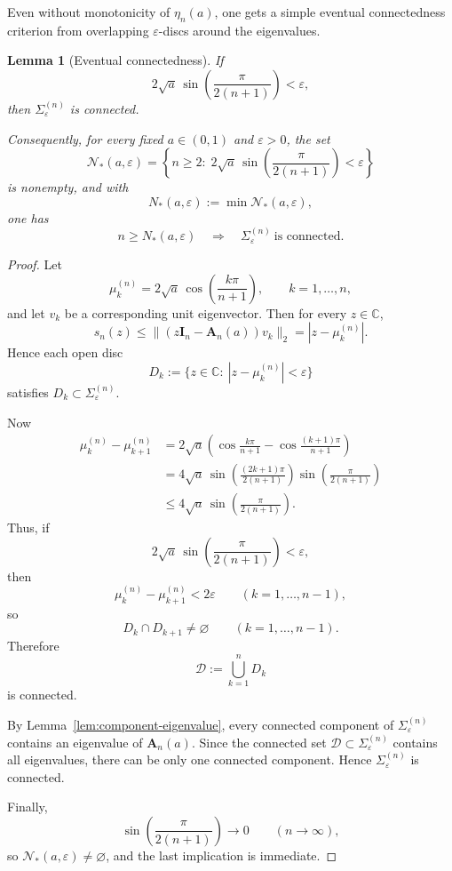 \documentclass[11pt]{article}
\numberwithin{equation}{section}
\newtheorem{lemma}[theorem]{Lemma}
\newcommand{\C}{\mathbb C}
\newcommand{\A}{\mathbf A}
\newcommand{\I}{\mathbf I}
\begin{document}
Even without monotonicity of \(\eta_n(a)\), one gets a simple eventual connectedness
criterion from overlapping \(\varepsilon\)-discs around the eigenvalues.

\begin{lemma}[Eventual connectedness]\label{lem:eventual-connectedness}
If
\[
2\sqrt a\,\sin\!\left(\frac{\pi}{2(n+1)}\right)<\varepsilon,
\]
then \(\Sigma_\varepsilon^{(n)}\) is connected.

Consequently, for every fixed \(a\in(0,1)\) and \(\varepsilon>0\), the set
\[
\mathcal N_*(a,\varepsilon)
=
\left\{
n\ge2:\;
2\sqrt a\,\sin\!\left(\frac{\pi}{2(n+1)}\right)<\varepsilon
\right\}
\]
is nonempty, and with
\[
N_*(a,\varepsilon):=\min \mathcal N_*(a,\varepsilon),
\]
one has
\[
n\ge N_*(a,\varepsilon)
\quad\Longrightarrow\quad
\Sigma_\varepsilon^{(n)}\ \text{is connected}.
\]
\end{lemma}

\begin{proof}
Let
\[
\mu_k^{(n)}=2\sqrt a\,\cos\!\left(\frac{k\pi}{n+1}\right),
\qquad k=1,\dots,n,
\]
and let \(v_k\) be a corresponding unit eigenvector.  Then for every \(z\in\C\),
\[
s_n(z)\le \|(z\I_n-\A_n(a))v_k\|_2=|z-\mu_k^{(n)}|.
\]
Hence each open disc
\[
D_k:=\{z\in\C:\ |z-\mu_k^{(n)}|<\varepsilon\}
\]
satisfies \(D_k\subset \Sigma_\varepsilon^{(n)}\).

Now
\begin{align*}
\mu_k^{(n)}-\mu_{k+1}^{(n)}
&=
2\sqrt a
\left(
\cos\!\frac{k\pi}{n+1}
-
\cos\!\frac{(k+1)\pi}{n+1}
\right) \\
&=
4\sqrt a\,
\sin\!\left(\frac{(2k+1)\pi}{2(n+1)}\right)
\sin\!\left(\frac{\pi}{2(n+1)}\right) \\
&\le
4\sqrt a\,\sin\!\left(\frac{\pi}{2(n+1)}\right).
\end{align*}
Thus, if
\[
2\sqrt a\,\sin\!\left(\frac{\pi}{2(n+1)}\right)<\varepsilon,
\]
then
\[
\mu_k^{(n)}-\mu_{k+1}^{(n)}<2\varepsilon
\qquad(k=1,\dots,n-1),
\]
so
\[
D_k\cap D_{k+1}\neq\varnothing
\qquad(k=1,\dots,n-1).
\]
Therefore
\[
\mathcal D:=\bigcup_{k=1}^n D_k
\]
is connected.

By Lemma~\ref{lem:component-eigenvalue}, every connected component of
\(\Sigma_\varepsilon^{(n)}\) contains an eigenvalue of \(\A_n(a)\). Since the connected set
\(\mathcal D\subset \Sigma_\varepsilon^{(n)}\) contains all eigenvalues, there can be only
one connected component. Hence \(\Sigma_\varepsilon^{(n)}\) is connected.

Finally,
\[
\sin\!\left(\frac{\pi}{2(n+1)}\right)\to0
\qquad(n\to\infty),
\]
so \(\mathcal N_*(a,\varepsilon)\neq\varnothing\), and the last implication is immediate.
\end{proof}
\end{document}
